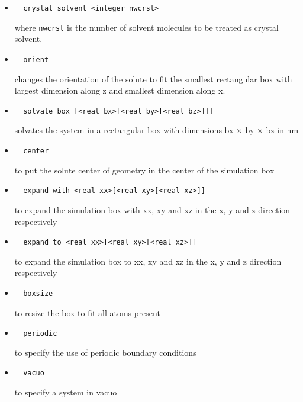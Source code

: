 \begin{itemize}
\item
\begin{verbatim}
  crystal solvent <integer nwcrst>
\end{verbatim}
where \verb+nwcrst+ is the number of solvent molecules to be treated
as crystal solvent.

\item
\begin{verbatim}
  orient
\end{verbatim}
changes the orientation of the solute to fit the smallest rectangular
box with largest dimension along z and smallest dimension along x.

\item
\begin{verbatim}
  solvate box [<real bx>[<real by>[<real bz>]]]
\end{verbatim}
solvates the system in a rectangular box with dimensions 
bx $\times$ by $\times$ bz in nm

\item
\begin{verbatim}
  center
\end{verbatim}
to put the solute center of geometry in the center of the
simulation box

\item
\begin{verbatim}
  expand with <real xx>[<real xy>[<real xz>]]
\end{verbatim}
to expand the simulation box with xx, xy and xz in the
x, y and z direction respectively

\item
\begin{verbatim}
  expand to <real xx>[<real xy>[<real xz>]]
\end{verbatim}
to expand the simulation box to xx, xy and xz in the
x, y and z direction respectively

\item
\begin{verbatim}
  boxsize
\end{verbatim}
to resize the box to fit all atoms present

\item
\begin{verbatim}
  periodic
\end{verbatim}
to specify the use of periodic boundary conditions

\item
\begin{verbatim}
  vacuo
\end{verbatim}
to specify a system in vacuo


\end{itemize}
